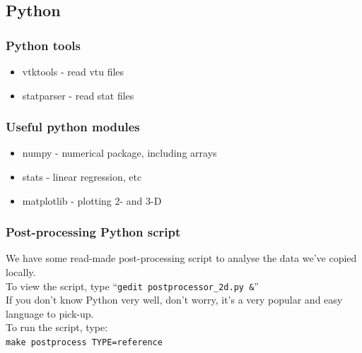 \documentclass[12pt]{beamer}
\begin{document}
\subsection{Python}
\begin{frame}
    \frametitle{Python tools}
\begin{itemize}
\item vtktools - read vtu files 
\item statparser - read stat files
\end{itemize}
\end{frame}

\begin{frame}
    \frametitle{Useful python modules}
\begin{itemize}
\item numpy - numerical package, including arrays
\item stats - linear regression, etc
\item matplotlib - plotting 2- and 3-D
\end{itemize}
\end{frame}

\begin{frame}
    \frametitle{Post-processing Python script}
We have some read-made post-processing script to analyse the data we've copied locally.\\
\vspace{5mm}
To view the script, type ``{\tt gedit postprocessor\_2d.py \&}''\\
\vspace{5mm}
If you don't know Python very well, don't worry, it's a very popular and easy language to pick-up.\\
\vspace{5mm}
To run the script, type:\\
{\tt make postprocess TYPE=reference}
\end{frame}
\end{document}
